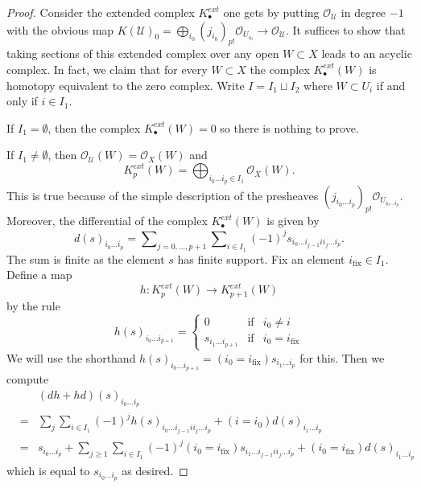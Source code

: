 \begin{proof}
Consider the extended complex $K^{ext}_\bullet$ one gets by putting
$\mathcal{O}_\mathcal{U}$ in degree $-1$ with the obvious map
$K(\mathcal{U})_0 =
\bigoplus_{i_0} (j_{i_0})_{p!}\mathcal{O}_{U_{i_0}} \to
\mathcal{O}_\mathcal{U}$.
It suffices to show that taking sections of this extended complex over
any open $W \subset X$ leads to an acyclic complex.
In fact, we claim that for every $W \subset X$ the complex
$K^{ext}_\bullet(W)$ is homotopy equivalent to the zero complex.
Write $I = I_1 \sqcup I_2$ where $W \subset U_i$ if and only
if $i \in I_1$.

\medskip\noindent
If $I_1 = \emptyset$, then the complex $K^{ext}_\bullet(W) = 0$ so there is
nothing to prove.

\medskip\noindent
If $I_1 \not = \emptyset$, then
$\mathcal{O}_\mathcal{U}(W) = \mathcal{O}_X(W)$
and
$$
K^{ext}_p(W) =
\bigoplus\nolimits_{i_0 \ldots i_p \in I_1} \mathcal{O}_X(W).
$$
This is true because of the simple description of the presheaves
$(j_{i_0 \ldots i_p})_{p!}\mathcal{O}_{U_{i_0 \ldots i_p}}$.
Moreover, the differential of the complex $K^{ext}_\bullet(W)$
is given by
$$
d(s)_{i_0 \ldots i_p} =
\sum\nolimits_{j = 0, \ldots, p + 1} \sum\nolimits_{i \in I_1}
(-1)^j s_{i_0 \ldots i_{j - 1} i i_j \ldots i_p}.
$$
The sum is finite as the element $s$ has finite support.
Fix an element $i_{\text{fix}} \in I_1$. Define a map
$$
h : K^{ext}_p(W) \longrightarrow K^{ext}_{p + 1}(W)
$$
by the rule
$$
h(s)_{i_0 \ldots i_{p + 1}} =
\left\{
\begin{matrix}
0 & \text{if} & i_0 \not = i \\
s_{i_1 \ldots i_{p + 1}} & \text{if} & i_0 = i_{\text{fix}}
\end{matrix}
\right.
$$
We will use the shorthand
$h(s)_{i_0 \ldots i_{p + 1}} = (i_0 = i_{\text{fix}}) s_{i_1 \ldots i_p}$
for this. Then we compute
\begin{eqnarray*}
& & (dh + hd)(s)_{i_0 \ldots i_p} \\
& = &
\sum_j \sum_{i \in I_1} (-1)^j h(s)_{i_0 \ldots i_{j - 1} i i_j \ldots i_p}
+
(i = i_0) d(s)_{i_1 \ldots i_p} \\
& = &
s_{i_0 \ldots i_p} +
\sum_{j \geq 1}\sum_{i \in I_1}
(-1)^j (i_0 = i_{\text{fix}}) s_{i_1 \ldots i_{j - 1} i i_j \ldots i_p}
+
(i_0 = i_{\text{fix}}) d(s)_{i_1 \ldots i_p}
\end{eqnarray*}
which is equal to $s_{i_0 \ldots i_p}$ as desired.
\end{proof}


